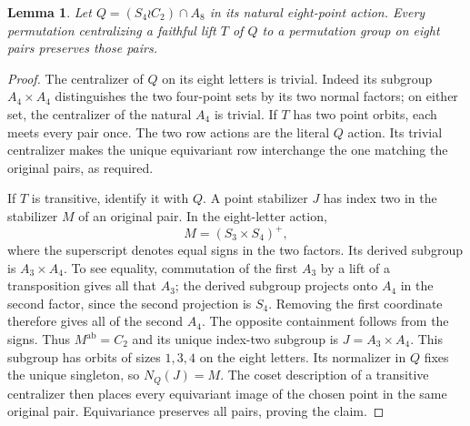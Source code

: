 \documentclass[11pt,a4paper]{article}
\newtheorem{lemma}{Lemma}
\begin{document}
\begin{lemma}\label{eight}
Let $Q=(S_4\wr C_2)\cap A_8$ in its natural eight-point
action. Every permutation centralizing a faithful lift $T$
of $Q$ to a permutation group on eight pairs preserves
those pairs.
\end{lemma}
\begin{proof}
The centralizer of $Q$ on its eight letters is trivial.
Indeed its subgroup $A_4\times A_4$ distinguishes the two
four-point sets by its two normal factors; on either set,
the centralizer of the natural $A_4$ is trivial.
If $T$ has two point orbits, each meets every pair once.
The two row actions are the literal $Q$ action. Its trivial
centralizer makes the unique equivariant row interchange
the one matching the original pairs, as required.

If $T$ is transitive, identify it with $Q$. A point stabilizer
$J$ has index two in the stabilizer $M$ of an original pair.
In the eight-letter action,
\[
              M=(S_3\times S_4)^+,
\]
where the superscript denotes equal signs in the two factors.
Its derived subgroup is $A_3\times A_4$. To see equality,
commutation of the first $A_3$ by a lift of a transposition
gives all that $A_3$; the derived subgroup projects onto
$A_4$ in the second factor, since the second projection is
$S_4$. Removing the first coordinate therefore gives all
of the second $A_4$. The opposite containment follows from
the signs. Thus $M^{\mathrm{ab}}=C_2$ and its unique
index-two subgroup is $J=A_3\times A_4$.
This subgroup has orbits of sizes $1,3,4$ on the eight
letters. Its normalizer in $Q$ fixes the unique singleton,
so $N_Q(J)=M$. The coset description of a transitive
centralizer then places every equivariant image of the
chosen point in the same original pair. Equivariance
preserves all pairs, proving the claim.
\end{proof}
\end{document}
